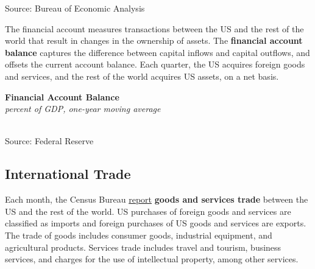 \documentclass{report}
\makeatletter
\newcommand{\tbllink}[1]{\href{https://raw.githubusercontent.com/bdecon/US-chartbook/master/chartbook/data/#1}{\faTable}}
\newcommand*\short[1]{\expandafter\@gobbletwo\number\numexpr#1\relax}
\newcommand{\sbar}[4]{
		\addplot[ybar stacked, bar width=2.3pt, draw opacity=0, fill=#1] 
			table [x=#2, y=#3, col sep=comma]{#4};}
\newcommand{\dateaxisticks}{
		date coordinates in=x, axis line style={draw=none},
		xmax={2024-01-31},
		max space between ticks=40,	    
		xtick={{1990-01-01}, {1992-01-01}, {1994-01-01}, 
			{1996-01-01}, {1998-01-01}, {2000-01-01}, 
			{2002-01-01}, {2004-01-01}, {2006-01-01},
			{2008-01-01}, {2010-01-01}, {2012-01-01}, {2014-01-01},
		    {2016-01-01}, {2018-01-01}, {2020-01-01}, {2022-01-01}, 
		    {2024-01-01}, {2026-01-01}},
		minor xtick={{1989-01-01}, {1991-01-01}, {1993-01-01},
			{1995-01-01}, {1997-01-01}, {1999-01-01}, 
			{2001-01-01}, {2003-01-01}, {2005-01-01}, {2007-01-01},
		    {2009-01-01}, {2011-01-01}, {2013-01-01}, {2015-01-01},
		    {2017-01-01}, {2019-01-01}, {2021-01-01}, {2023-01-01}, 
		    {2025-01-01}, {2027-01-01}},
		enlarge y limits={0.06}, enlarge x limits={0.01},
		xticklabel style={align=center, yshift=-2pt}, tick label style={inner sep=0pt},
		}
\newcommand{\bbar}[2]{extra #1 ticks = {{#2}}, extra #1 tick labels = ,
		extra #1 tick style = {grid=major, grid style={thick, black!25}},}
\newcommand{\stdline}[4]{\addplot[very thick, no markers, color=#1] 
		table [x=#2, y=#3, col sep=comma] {#4};	}
\newcommand{\rbars}{
		\fill[color=black!10] (axis cs:{1990-07-01},\pgfkeysvalueof{/pgfplots/ymin})
			rectangle (axis cs:{1991-03-01}, \pgfkeysvalueof{/pgfplots/ymax});
		\fill[color=black!10] (axis cs:{2007-12-01},\pgfkeysvalueof{/pgfplots/ymin})
			rectangle (axis cs:{2009-07-01}, \pgfkeysvalueof{/pgfplots/ymax});
		\fill[color=black!10] (axis cs:{2001-03-01},\pgfkeysvalueof{/pgfplots/ymin})
			rectangle (axis cs:{2001-11-01}, \pgfkeysvalueof{/pgfplots/ymax});
		\fill[color=black!10] (axis cs:{2020-02-01},\pgfkeysvalueof{/pgfplots/ymin})
			rectangle (axis cs:{2020-05-01}, \pgfkeysvalueof{/pgfplots/ymax});}
\makeatother
\begin{document}
{\begin{minipage}{1.0\textwidth}
\footnotesize{Source: Bureau of Economic Analysis}
\vspace{4mm}

\small The financial account measures transactions between the US and the rest of the world that result in changes in the ownership of assets. The \textbf{financial account balance} captures the difference between capital inflows and capital outflows, and offsets the current account balance. Each quarter, the US acquires foreign goods and services, and the rest of the world acquires US assets, on a net basis. 

 
\vspace{1mm}

\normalsize \textbf{Financial Account Balance}\\
\footnotesize{\textit{percent of GDP, one-year moving average}}\\
\hspace*{-2mm} \\
\footnotesize{Source: Federal Reserve} \hfill \tbllink{fabz1.csv}
\end{minipage}
\newpage
\vspace*{-10mm}

\hypertarget{extt}{\label{extt}}
\begin{minipage}{1.0\textwidth}
\subsection*{International Trade}
\small Each month, the Census Bureau \href{https://www.census.gov/foreign-trade/Press-Release/current\_press\_release/index.html}{report} \textbf{goods and services trade} between the US and the rest of the world. US purchases of foreign goods and services are classified as imports and foreign purchases of US goods and services are exports. The trade of goods includes consumer goods, industrial equipment, and agricultural products. Services trade includes travel and tourism, business services, and charges for the use of intellectual property, among other services. 
\end{minipage}
\vspace{-1mm}

}
\end{document}
